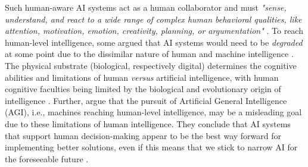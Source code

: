 Such human-aware AI systems act as a human collaborator and must \textit{"sense, understand, and react to a wide
range of complex human behavioral qualities, like attention, motivation, emotion, creativity, planning, or argumentation"}
\citep{kortelingHumanArtificialIntelligence2021}. To reach human-level intelligence, some argued that AI systems would
need to be \textit{degraded} at some point due to the dissimilar nature of human and machine intelligence
\citep{kortelingHumanArtificialIntelligence2021}.
The physical substrate (biological, respectively digital) determines the cognitive abilities and limitations of human
\textit{versus} artificial intelligence, with human cognitive faculties being limited by the biological and evolutionary
origin of intelligence \citep{kortelingHumanArtificialIntelligence2021}. Further, \cite{kortelingHumanArtificialIntelligence2021}
argue that the pursuit of Artificial General Intelligence (AGI), i.e., machines reaching human-level intelligence, may
be a misleading goal due to these limitations of human intelligence. They conclude that AI systems that support human
decision-making appear to be the best way forward for implementing better solutions, even if this means that we stick
to narrow AI for the foreseeable future \citep{kortelingHumanArtificialIntelligence2021}.

